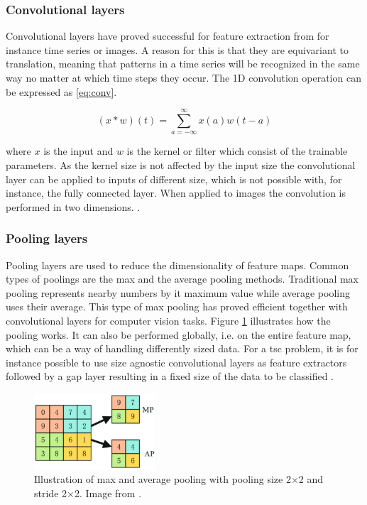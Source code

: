 
\subsubsection{Convolutional layers}
Convolutional layers have proved successful for feature extraction from for instance time series or images. A reason for this is that they are equivariant to translation, meaning that patterns in a time series will be recognized in the same way no matter at which time steps they occur. The 1D convolution operation can be expressed as \eqref{eq:conv}.

\begin{equation}
 (x * w)(t) = \sum_{a=-\infty}^\infty x(a)w(t-a)
 \label{eq:conv}
\end{equation}

where $x$ is the input and $w$ is the kernel or filter which consist of the trainable parameters. As the kernel size is not affected by the input size the convolutional layer can be applied to inputs of different size, which is not possible with, for instance, the fully connected layer. When applied to images the convolution is performed in two dimensions. \cite{Goodfellow2016}.


\subsubsection{Pooling layers}
Pooling layers are used to reduce the dimensionality of feature maps. Common types of poolings are the max and the average pooling methods. Traditional max pooling represents nearby numbers by it maximum value while average pooling uses their average. This type of max pooling has proved efficient together with convolutional layers for computer vision tasks. Figure \ref{fig:pooling} illustrates how the pooling works. It can also be performed globally, i.e. on the entire feature map, which can be a way of handling differently sized data. For a \gls{tsc} problem, it is for instance possible to use size agnostic convolutional layers as feature extractors followed by a \gls{gap} layer resulting in a fixed size of the data to be classified \cite{Chollet2018}.

\begin{figure}
  \centering
  \includegraphics[width=0.4\textwidth]{files/figs/backg/pooling.png}
  \caption{Illustration of max and average pooling with pooling size 2$\times$2 and stride 2$\times$2. Image from \cite{Wang2018}.}
  \label{fig:pooling}
\end{figure}

